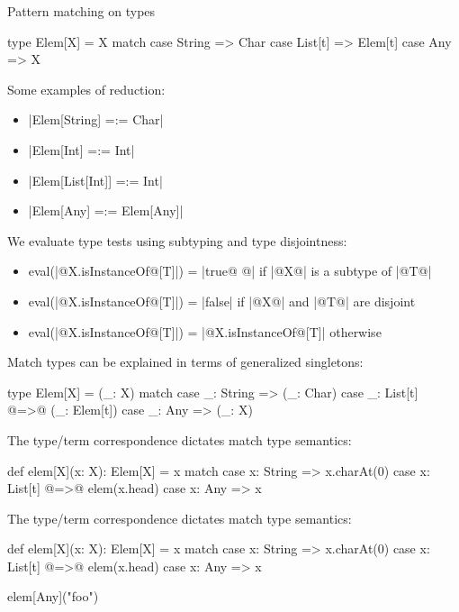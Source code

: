 \documentclass[10pt]{beamer}
\newenvironment{slide}[2][]
  {\begin{frame}[fragile,environment=slide,#1]{#2}}
  {\end{frame}}
\newcommand{\tp}[1]{\color{typeColor}#1}
\begin{document}
\begin{slide}{Pattern matching on types}
\begin{code}
type Elem[X] = X match
  case String => Char
  case List[t] => Elem[t]
  case Any => X
\end{code}

\medskip

\begin{overprint}
Some examples of reduction:
\begin{itemize}
  \item |Elem[String] =:= Char|
  \item |Elem[Int] =:= Int|
  \item |Elem[List[Int]] =:= Int|
  \item |Elem[Any] =:= Elem[Any]|
\end{itemize}

We evaluate type tests using subtyping and type disjointness:
\begin{itemize}
  \item eval(|@\tp{X.isInstanceOf}@[T]|) = |true@ @| \quad if |@\tp{X}@| is a subtype of |@\tp{T}@|
  \item eval(|@\tp{X.isInstanceOf}@[T]|) = |false| \quad if |@\tp{X}@| and |@\tp{T}@| are disjoint
  \item eval(|@\tp{X.isInstanceOf}@[T]|) = |@\tp{X.isInstanceOf}@[T]| \quad otherwise
\end{itemize}

Match types can be explained in terms of generalized singletons:

\medskip
\begin{code}
type Elem[X] = { (_: X) match
  case _: String => (_: Char)
  case _: List[t] @=>@ (_: Elem[t])
  case _: Any => (_: X)
}
\end{code}

The type/term correspondence dictates match type semantics:

\medskip
\begin{code}
def elem[X](x: X): Elem[X] = x match
  case x: String => x.charAt(0)
  case x: List[t] @=>@ elem(x.head)
  case x: Any => x
\end{code}

The type/term correspondence dictates match type semantics:

\medskip
\begin{code}
def elem[X](x: X): Elem[X] = x match
  case x: String => x.charAt(0)
  case x: List[t] @=>@ elem(x.head)
  case x: Any => x

elem[Any]("foo")
\end{code}
\end{overprint}
\end{slide}
\end{document}
